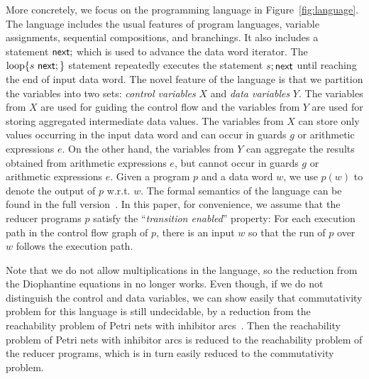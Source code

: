 More concretely, we focus on the programming language in Figure~\ref{fig:language}. The language includes the usual features of program languages, variable assignments, sequential compositions, and branchings. It also includes a statement $\mathsf{next};$ which is used to advance the data word iterator. The $\loopL{s\ \nnext;}$ statement repeatedly executes the statement $s;\mathsf{next}$ until reaching the end of input data word.
The novel feature of the language is that we partition the variables into two sets: \emph{control variables} $X$ and \emph{data variables} $Y$.
The variables from $X$ are used for guiding the control flow and the variables from $Y$ are used for storing aggregated intermediate data values.
The variables from $X$ can store only values occurring in the input data word and can occur in guards $g$ or arithmetic expressions $e$.
On the other hand, the variables from $Y$ can aggregate the results obtained from arithmetic expressions $e$, but cannot occur in guards $g$ or arithmetic expressions $e$.
Given a program $p$ and a data word $w$, we use $p(w)$ to denote the output of $p$ w.r.t. $w$. The formal semantics of the language can be found in the full version~\cite{full-version}. In this paper, for convenience, we assume that the reducer programs $p$ satisfy the ``\emph{transition enabled}'' property: For each execution path in the control flow graph of $p$, there is an input $w$ so that the run of $p$ over $w$ follows the execution path. %

Note that we do not allow multiplications in the language, so the reduction from the Diophantine equations in \cite{CHSW15} no longer works. Even though, if we do not distinguish the control and data variables, we can show easily that commutativity problem for this language is still undecidable, by a reduction from the reachability problem of Petri nets with inhibitor arcs~\cite{Min71,Rei08}.
Then the reachability problem of Petri nets with inhibitor arcs is reduced to the reachability problem of the reducer programs, which is in turn easily reduced to the commutativity problem.

